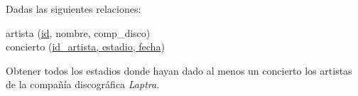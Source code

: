 \documentclass[preview]{standalone}
\begin{document}
Dadas las siguientes relaciones:
\vspace{.2cm}

\begin{center}
artista (\underline{id}, nombre, comp\_disco)\\
\vspace{.35cm}
concierto (\underline{id\_artista, estadio, fecha})\\
\vspace{0.5cm}
\end{center}

Obtener todos los estadios donde hayan dado al menos un concierto los artistas de la compañía discográfica \textit{Laptra}.
\vspace{.35cm}
\end{document}
